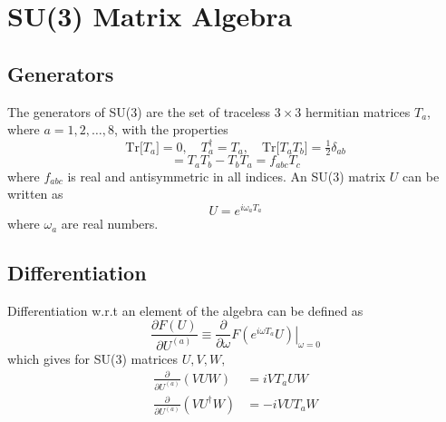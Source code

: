 \documentclass[a4paper,12pt]{article}
\newcommand{\tr}[1]{\text{Tr}\big[#1\big]}
\begin{document}
\appendix
\section{SU(3) Matrix Algebra}

\subsection{Generators}
The generators of SU(3) are the set of traceless $3\times 3$ hermitian matrices $T_a$, where $a=1,2,\ldots,8$, with the properties
\begin{equation}
\tr{T_a}=0, \quad T_a^{\dagger}=T_a, \quad \tr{T_a T_b} = \tfrac{1}{2}\delta_{ab}
\end{equation}
\begin{equation}
[T_a,T_b] = T_a T_b - T_b T_a = f_{abc} T_c
\end{equation}
where $f_{abc}$ is real and antisymmetric in all indices. An SU(3) matrix $U$ can be written as
\begin{equation}
U = e^{i \omega_a T_a}
\end{equation}
where $\omega_a$ are real numbers.

\subsection{Differentiation}
Differentiation w.r.t an element of the algebra can be defined as
\begin{equation}
\frac{\partial F(U)}{\partial U^{(a)}} \equiv \frac{\partial}{\partial \omega} \left. F(e^{i \omega T_a} U) \right|_{\omega=0}
\end{equation}
which gives for SU(3) matrices $U, V, W,$
\begin{align}
\frac{\partial}{\partial U^{(a)}} \left( V U W \right) &= i V T_a U W \\
\frac{\partial}{\partial U^{(a)}} \left( V U^{\dagger} W \right) &= -i V U T_a W
\end{align}
\end{document}
